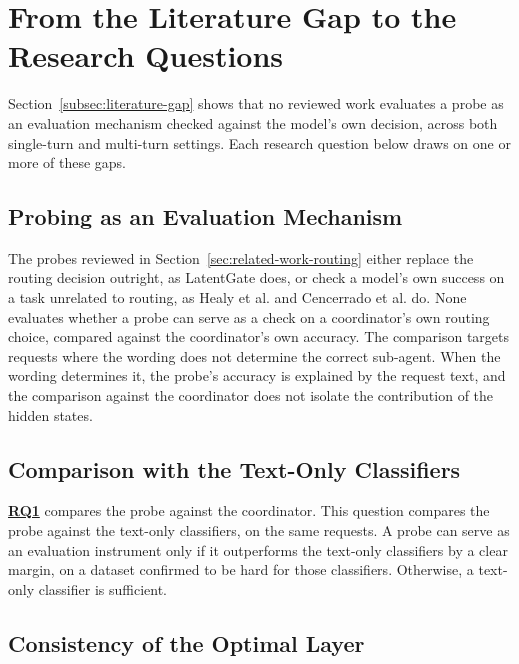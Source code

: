 \section{From the Literature Gap to the Research Questions}
\label{sec:rq-derivation}

Section~\ref{subsec:literature-gap} shows that no reviewed work evaluates a probe as an evaluation mechanism checked against the model's own decision, across both single-turn and multi-turn settings. Each research question below draws on one or more of these gaps.

\subsection{Probing as an Evaluation Mechanism}
\label{subsec:rq1-derivation}

\label{rq:rq1}


\noindent The probes reviewed in Section~\ref{sec:related-work-routing} either replace the routing decision outright, as LatentGate does, or check a model's own success on a task unrelated to routing, as Healy et al. and Cencerrado et al. do. None evaluates whether a probe can serve as a check on a coordinator's own routing choice, compared against the coordinator's own accuracy. The comparison targets requests where the wording does not determine the correct sub-agent. When the wording determines it, the probe's accuracy is explained by the request text, and the comparison against the coordinator does not isolate the contribution of the hidden states.

\subsection{Comparison with the Text-Only Classifiers}
\label{subsec:rq2-derivation}

\label{rq:rq2}


\noindent \hyperref[rq:rq1]{\textbf{RQ1}} compares the probe against the coordinator. This question compares the probe against the text-only classifiers, on the same requests. A probe can serve as an evaluation instrument only if it outperforms the text-only classifiers by a clear margin, on a dataset confirmed to be hard for those classifiers. Otherwise, a text-only classifier is sufficient.

\subsection{Consistency of the Optimal Layer}
\label{subsec:rq3-derivation}


